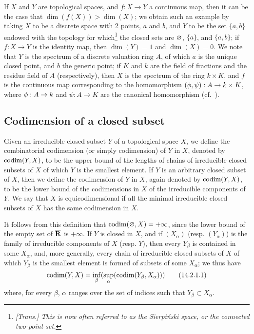 \begin{rmk}[14.1.12]
\label{0.14.1.12}
If $X$ and $Y$ are topological spaces, and $f:X\to Y$ a continuous map, then it can be the case that $\dim(f(X))>\dim(X)$;
we obtain such an example by taking $X$ to be a discrete space with 2 points, $a$ and $b$, and $Y$ to be the set $\{a,b\}$ endowed with the topology for which\footnote{\emph{[Trans.] This is now often referred to as the \emph{Sierpiński space}, or the \emph{connected two-point set}.}} the closed sets are $\varnothing$, $\{a\}$, and $\{a,b\}$;
if $f:X\to Y$ is the identity map, then $\dim(Y)=1$ and $\dim(X)=0$.
We note that $Y$ is the spectrum of a discrete valuation ring $A$, of which $a$ is the unique closed point, and $b$ the generic point;
if $K$ and $k$ are the field of fractions and the residue field of $A$ (respectively), then $X$ is the spectrum of the ring $k\times K$, and $f$ is the continuous map corresponding to the homomorphism $(\vphi,\psi):A\to k\times K$, where $\vphi:A\to k$ and $\psi:A\to K$ are the canonical homomorphism (cf.~).
\end{rmk}

\subsection{Codimension of a closed subset}
\label{subsection:codimension-of-a-closed-subset}

\begin{defn}[14.2.1]
\label{0.14.2.1}
Given an irreducible closed subset $Y$ of a topological space $X$, we define the combinatorial codimension (or simply codimension) of $Y$ in $X$, denoted by ${\mathop{\mathrm{codim}}\nolimits}(Y,X)$, to be the upper bound of the lengths of chains of irreducible closed subsets of $X$ of which $Y$ is the smallest element.
If $Y$ is an arbitrary closed subset of $X$, then we define the codimension of $Y$ in $X$, again denoted by ${\mathop{\mathrm{codim}}\nolimits}(Y,X)$, to be the lower bound of the codimensions in $X$ of the irreducible components of $Y$.
We say that $X$ is equicodimensional if all the minimal irreducible closed subsets of $X$ has the same codimension in $X$.
\end{defn}

It follows from this definition that ${\mathop{\mathrm{codim}}\nolimits}(\varnothing,X)=+\infty$, since the lower bound of the empty set of $\overline{\mathbf{R}}$ is $+\infty$.
If $Y$ is closed in $X$, and if $(X_\alpha)$ (resp. $(Y_\alpha)$) is the family of irreducible components of $X$ (resp. $Y$), then every $Y_\beta$ is contained in some $X_\alpha$, and, more generally, every chain of irreducible closed subsets of $X$ of which $Y_\beta$ is the smallest element is formed of subsets of some $X_\alpha$;
we thus have
\begin{equation*}
\label{0.14.2.1.1}
    {\mathop{\mathrm{codim}}\nolimits}(Y,X) = \inf_\beta(\sup_\alpha({\mathop{\mathrm{codim}}\nolimits}(Y_\beta,X_\alpha)))\tag{14.2.1.1}
\end{equation*}
where, for every $\beta$, $\alpha$ ranges over the set of indices such that $Y_\beta\subset X_\alpha$.

